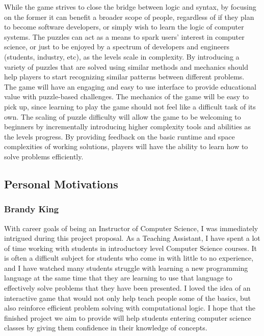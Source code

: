 While the game strives to close the bridge between logic and syntax, by focusing
on the former it can benefit a broader scope of people, regardless of if they
plan to become software developers, or simply wish to learn the logic of
computer systems. The puzzles can act as a means to spark users’ interest in
computer science, or just to be enjoyed by a spectrum of developers and
engineers (students, industry, etc), as the levels scale in complexity. By
introducing a variety of puzzles that are solved using similar methods and
mechanics should help players to start recognizing similar patterns between
different problems.\\

The game will have an engaging and easy to use interface to provide educational
value with puzzle-based challenges. The mechanics of the game will be easy to
pick up, since learning to play the game should not feel like a difficult task
of its own. The scaling of puzzle difficulty will allow the game to be welcoming
to beginners by incrementally introducing higher complexity tools and abilities
as the levels progress. By providing feedback on the basic runtime and space
complexities of working solutions, players will have the ability to learn how to
solve problems efficiently.\\

\subsection{Personal Motivations}
\subsubsection{Brandy King}
With career goals of being an Instructor of Computer Science, I was immediately
intrigued during this project proposal. As a Teaching Assistant, I have spent a
lot of time working with students in introductory level Computer Science
courses. It is often a difficult subject for students who come in with little to
no experience, and I have watched many students struggle with learning a new
programming language at the same time that they are learning to use that
language to effectively solve problems that they have been presented. I loved
the idea of an interactive game that would not only help teach people some of
the basics, but also reinforce efficient problem solving with computational
logic. I hope that the finished project we aim to provide will help students
entering computer science classes by giving them confidence in their knowledge
of concepts.\\

